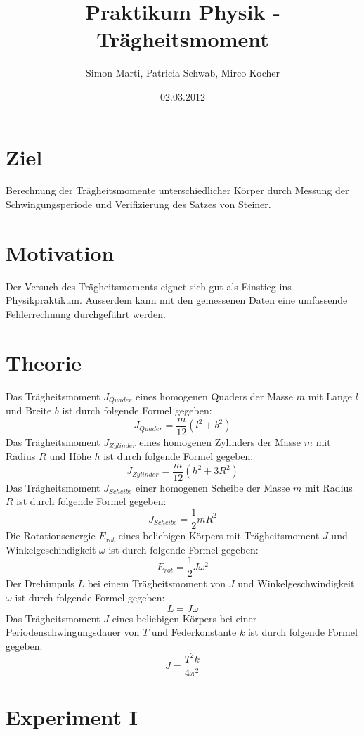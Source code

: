 \documentclass[12pt,a4paper]{article}
\title{Praktikum Physik - Tr\"agheitsmoment}
\author{Simon Marti, Patricia Schwab, Mirco Kocher}
\date{02.03.2012}
\begin{document}
\maketitle

\section*{Ziel}
Berechnung der Tr\"agheitsmomente unterschiedlicher K\"orper durch Messung der Schwingungsperiode und Verifizierung des Satzes von Steiner.

\section*{Motivation}
Der Versuch des Tr\"agheitsmoments eignet sich gut als Einstieg ins Physikpraktikum. Ausserdem kann mit den gemessenen Daten eine umfassende Fehlerrechnung durchgef\"uhrt werden.

\section*{Theorie}
Das Tr\"agheitsmoment $J_{Quader}$ eines homogenen Quaders der Masse $m$ mit Lange $l$ und Breite $b$ ist durch folgende Formel gegeben:
\[ J_{Quader} = \frac{m}{12}(l^2 + b^2) \]
Das Tr\"agheitsmoment $J_{Zylinder}$ eines homogenen Zylinders der Masse $m$ mit Radius $R$ und H\"ohe $h$ ist durch folgende Formel gegeben:
\[  J_{Zylinder} = \frac{m}{12}(h^2 + 3R^2) \]
Das Tr\"agheitsmoment $J_{Scheibe}$ einer homogenen Scheibe der Masse $m$ mit Radius $R$ ist durch folgende Formel gegeben:
\[  J_{Scheibe} = \frac{1}{2}mR^2 \]
Die Rotationsenergie $E_{rot}$ eines beliebigen K\"orpers mit Tr\"agheitsmoment $J$ und Winkelgeschindigkeit $\omega$ ist durch folgende Formel gegeben:
\[ E_{rot} = \frac{1}{2}J\omega^2 \]
Der Drehimpuls $L$ bei einem Tr\"agheitsmoment von $J$ und Winkelgeschwindigkeit $\omega$ ist durch folgende Formel gegeben:
\[ L = J\omega \]
Das Tr\"agheitsmoment $J$ eines beliebigen K\"orpers bei einer Periodenschwingungsdauer von $T$ und Federkonstante $k$ ist durch folgende Formel gegeben:
\[ J = \frac{T^2k}{4\pi^2} \]

\section*{Experiment I}
\end{document}

